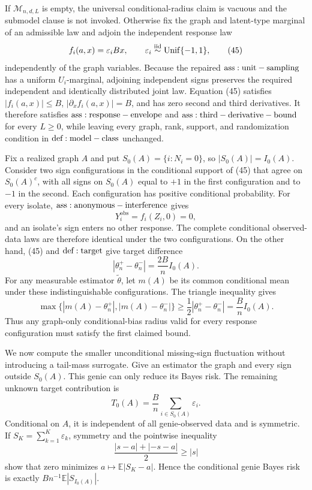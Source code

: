 If \(\mathcal M_{n,d,L}\) is empty, the universal conditional-radius claim is vacuous and the submodel clause is not invoked.  Otherwise fix the graph and latent-type marginal of an admissible law and adjoin the independent response law
\[
 f_i(a,x)=\varepsilon_iBx,
 \qquad
 \varepsilon_i\overset{\mathrm{iid}}{\sim}{\rm Unif}\{-1,1\},
\tag{45}
\]
independently of the graph variables.  Because the repaired \({\rm ass:unit-sampling}\) has a uniform \(U_i\)-marginal, adjoining independent signs preserves the required independent and identically distributed joint law.  Equation (45) satisfies \(|f_i(a,x)|\le B\), \(|\partial_xf_i(a,x)|=B\), and has zero second and third derivatives.  It therefore satisfies \({\rm ass:response-envelope}\) and \({\rm ass:third-derivative-bound}\) for every \(L\ge0\), while leaving every graph, rank, support, and randomization condition in \({\rm def:model-class}\) unchanged.

Fix a realized graph \(A\) and put \(S_0(A)=\{i:N_i=0\}\), so \(|S_0(A)|=I_0(A)\).  Consider two sign configurations in the conditional support of (45) that agree on \(S_0(A)^c\), with all signs on \(S_0(A)\) equal to \(+1\) in the first configuration and to \(-1\) in the second.  Each configuration has positive conditional probability.  For every isolate, \({\rm ass:anonymous-interference}\) gives
\[
 Y_i^{\mathrm{obs}}=f_i(Z_i,0)=0,
\tag{46}
\]
and an isolate's sign enters no other response.  The complete conditional observed-data laws are therefore identical under the two configurations.  On the other hand, (45) and \({\rm def:target}\) give target difference
\[
 |\theta_n^+-\theta_n^-|=\frac{2B}{n}I_0(A).
\tag{47}
\]
For any measurable estimator \(\widetilde\theta\), let \(m(A)\) be its common conditional mean under these indistinguishable configurations.  The triangle inequality gives
\[
 \max\{|m(A)-\theta_n^+|,|m(A)-\theta_n^-|\}
 \ge\frac12|\theta_n^+-\theta_n^-|
 =\frac BnI_0(A).
\tag{48}
\]
Thus any graph-only conditional-bias radius valid for every response configuration must satisfy the first claimed bound.

We now compute the smaller unconditional missing-sign fluctuation without introducing a tail-mass surrogate.  Give an estimator the graph and every sign outside \(S_0(A)\).  This genie can only reduce its Bayes risk.  The remaining unknown target contribution is
\[
 T_0(A)=\frac Bn\sum_{i\in S_0(A)}\varepsilon_i.
\tag{49}
\]
Conditional on \(A\), it is independent of all genie-observed data and is symmetric.  If \(S_K=\sum_{k=1}^K\varepsilon_k\), symmetry and the pointwise inequality
\[
 \frac{|s-a|+|-s-a|}{2}\ge |s|
\]
show that zero minimizes \(a\mapsto\mathbb E|S_K-a|\).  Hence the conditional genie Bayes risk is exactly \(Bn^{-1}\mathbb E|S_{I_0(A)}|\).

